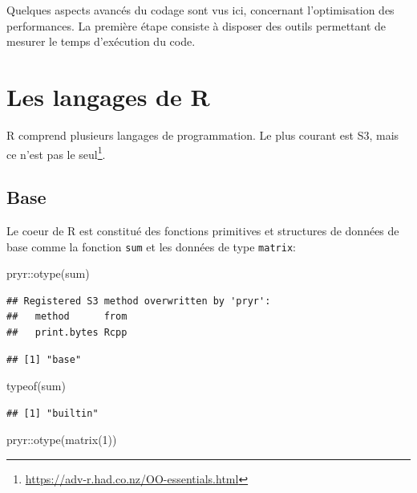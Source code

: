 \documentclass[
  11pt,
  french,
  a4paper,
  extrafontsizes,onecolumn,openright
  ]{memoir}
\newenvironment{Shaded}{\begin{snugshade}}{\end{snugshade}}
\newcommand{\DecValTok}[1]{\textcolor[rgb]{0.00,0.00,0.81}{#1}}
\newcommand{\FunctionTok}[1]{\textcolor[rgb]{0.00,0.00,0.00}{#1}}
\newcommand{\NormalTok}[1]{#1}
\newcommand{\SpecialCharTok}[1]{\textcolor[rgb]{0.00,0.00,0.00}{#1}}
\begin{document}
Quelques aspects avancés du codage sont vus ici, concernant l'optimisation des performances.
La première étape consiste à disposer des outils permettant de mesurer le temps d'exécution du code.

\hypertarget{les-langages-de-r}{%
\section{Les langages de R}\label{les-langages-de-r}}

R comprend plusieurs langages de programmation.
Le plus courant est S3, mais ce n'est pas le seul\footnote{\url{https://adv-r.had.co.nz/OO-essentials.html}}.

\hypertarget{base}{%
\subsection{Base}\label{base}}

Le coeur de R est constitué des fonctions primitives et structures de données de base comme la fonction \texttt{sum} et les données de type \texttt{matrix}:

\scriptsize

\begin{Shaded}
\begin{Highlighting}[]
\NormalTok{pryr}\SpecialCharTok{::}\FunctionTok{otype}\NormalTok{(sum)}
\end{Highlighting}
\end{Shaded}

\begin{verbatim}
## Registered S3 method overwritten by 'pryr':
##   method      from
##   print.bytes Rcpp
\end{verbatim}

\begin{verbatim}
## [1] "base"
\end{verbatim}

\begin{Shaded}
\begin{Highlighting}[]
\FunctionTok{typeof}\NormalTok{(sum)}
\end{Highlighting}
\end{Shaded}

\begin{verbatim}
## [1] "builtin"
\end{verbatim}

\begin{Shaded}
\begin{Highlighting}[]
\NormalTok{pryr}\SpecialCharTok{::}\FunctionTok{otype}\NormalTok{(}\FunctionTok{matrix}\NormalTok{(}\DecValTok{1}\NormalTok{))}
\end{Highlighting}
\end{Shaded}
\end{document}
